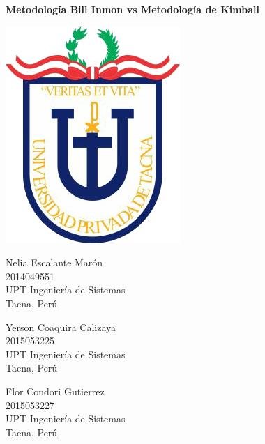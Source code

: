 \documentclass[11pt,a4paper]{article}
\begin{document}
		
		\begin{center}
			\huge \textbf{Metodología Bill Inmon vs Metodología de Kimball} 
		\end{center}
		\vspace{\baselineskip}
		\begin{center}
			\includegraphics[scale=0.37]{./Imagenes/logo}
		\end{center}
		\vspace{\baselineskip}
		\begin{multicols}{2}
			\small
			\begin{center}
				Nelia Escalante Marón\\
				2014049551\\
				UPT Ingeniería de Sistemas\\
				Tacna, Perú\\
				
				\vspace{\baselineskip}
				
				Yerson Coaquira Calizaya\\
				2015053225\\
				UPT Ingeniería de Sistemas\\  
				Tacna, Perú\\   
				\columnbreak              
				
				Flor Condori Gutierrez\\
				2015053227\\
				UPT Ingeniería de Sistemas\\  
				Tacna, Perú\\                 
				
				           
			\end{center}
			\normalsize			
		\end{multicols}
		\vspace{\baselineskip}
		\vspace{\baselineskip}
		\vspace{\baselineskip}
\end{document}
